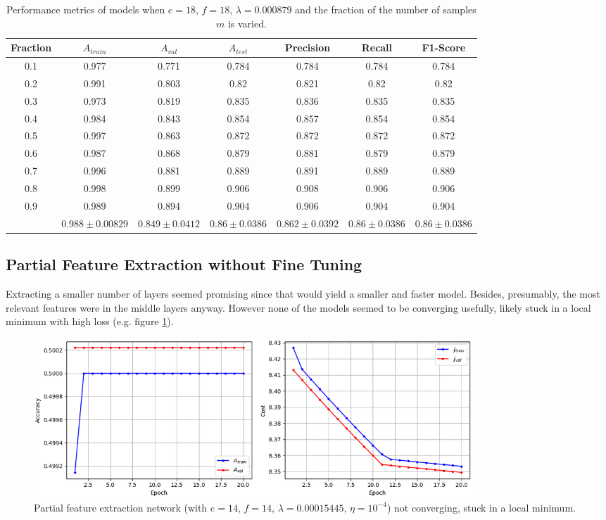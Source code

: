 \begin{table}[ht]
\centering
\begin{tabular}{ |c|c|c|c|c|c|c| }
\hline
Fraction & $A_{train}$ & $A_{val}$ & $A_{test}$ & Precision & Recall & F1-Score \\
\hline
0.1 & 0.977 & 0.771 & 0.784 & 0.784 & 0.784 & 0.784 \\
0.2 & 0.991 & 0.803 & 0.82  & 0.821 & 0.82  & 0.82  \\
0.3 & 0.973 & 0.819 & 0.835 & 0.836 & 0.835 & 0.835 \\
0.4 & 0.984 & 0.843 & 0.854 & 0.857 & 0.854 & 0.854 \\
0.5 & 0.997 & 0.863 & 0.872 & 0.872 & 0.872 & 0.872 \\
0.6 & 0.987 & 0.868 & 0.879 & 0.881 & 0.879 & 0.879 \\
0.7 & 0.996 & 0.881 & 0.889 & 0.891 & 0.889 & 0.889 \\
0.8 & 0.998 & 0.899 & 0.906 & 0.908 & 0.906 & 0.906 \\
0.9 & 0.989 & 0.894 & 0.904 & 0.906 & 0.904 & 0.904 \\
\hline
 & $0.988\pm0.00829$ & $0.849\pm0.0412$ & $0.86\pm0.0386$ & $0.862\pm0.0392$ & $0.86\pm0.0386$ & $0.86\pm0.0386$ \\
\hline
\end{tabular}
\caption{Performance metrics of models when $e = 18$, $f = 18$, $\lambda = 0.000879$ and the fraction of the number of samples $m$ is varied.}
\label{table:vgg16_total_debug}
\end{table}

\subsection{Partial Feature Extraction without Fine Tuning}

Extracting a smaller number of layers seemed promising since that would yield a smaller and faster model. Besides, presumably, the most relevant features were in the middle layers anyway. However none of the models seemed to be converging usefully, likely stuck in a local minimum with high loss (e.g. figure \ref{fig:vgg16_partial_divergence}).

\begin{figure}[ht]
    \centering
    \includegraphics[width=0.8\textwidth]{figs/vgg16_partial_divergence.png}
    \caption{Partial feature extraction network (with $e = 14$, $f = 14$, $\lambda = 0.00015445$, $\eta = 10^{-4}$) not converging, stuck in a local minimum.}
    \label{fig:vgg16_partial_divergence}
\end{figure}


